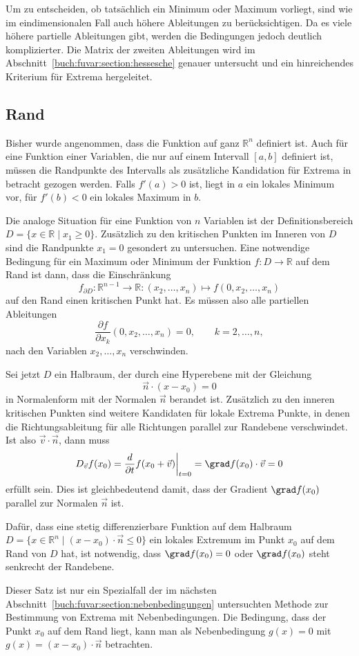 Um zu entscheiden, ob tatsächlich ein Minimum oder Maximum vorliegt,
sind wie im eindimensionalen Fall auch höhere Ableitungen zu berücksichtigen.
Da es viele höhere partielle Ableitungen gibt, werden die Bedingungen
jedoch deutlich komplizierter.
Die Matrix der zweiten Ableitungen wird im
Abschnitt~\ref{buch:fuvar:section:hessesche} genauer untersucht 
und ein hinreichendes Kriterium für Extrema hergeleitet.

%
%
\subsection{Rand}
Bisher wurde angenommen, dass die Funktion auf ganz $\mathbb{R}^n$
definiert ist.
Auch für eine Funktion einer Variablen, die nur auf einem Intervall
$[a,b]$ definiert ist, müssen die Randpunkte des Intervalls als
zusätzliche Kandidation für Extrema in betracht gezogen werden.
Falls $f'(a)>0$ ist, liegt in $a$ ein lokales Minimum vor, für
$f'(b)<0$ ein lokales Maximum in $b$.

Die analoge Situation für eine Funktion von $n$ Variablen ist der
Definitionsbereich $D=\{x\in \mathbb{R}\mid x_1\ge 0\}$.
Zusätzlich zu den kritischen Punkten im Inneren von $D$ sind die
Randpunkte $x_1=0$ gesondert zu untersuchen.
Eine notwendige Bedingung für ein Maximum oder Minimum der Funktion
$f\colon D\to\mathbb{R}$ auf dem Rand ist dann, dass die Einschränkung
\[
f_{\partial D}
\colon
\mathbb{R}^{n-1}\to \mathbb{R}
:
(x_2,\dots,x_n)\mapsto f(0,x_2,\dots,x_n)
\]
auf den Rand einen kritischen Punkt hat.
Es müssen also alle partiellen Ableitungen
\[
\frac{\partial f}{\partial x_k}(0,x_2,\dots,x_n)
=
0,\qquad k=2,\dots,n,
\]
nach den Variablen
$x_2,\dots,x_n$ verschwinden.

Sei jetzt $D$ ein Halbraum, der durch eine Hyperebene mit der Gleichung
\[
\vec{n}\cdot (x-x_0) = 0
\]
in Normalenform mit der Normalen $\vec{n}$ berandet ist.
Zusätzlich zu den inneren kritischen Punkten sind weitere Kandidaten
für lokale Extrema Punkte, in denen die Richtungsableitung für alle
Richtungen parallel zur Randebene verschwindet.
Ist also $\vec{v}\cdot \vec{n}$, dann muss
\[
D_{\vec{v}} f(x_0)
=
\frac{d}{\partial t}f(x_0+\vec{v})\bigg|_{t=0}
=
\grad f(x_0)\cdot \vec{v}
=
0
\]
erfüllt sein.
Dies ist gleichbedeutend damit, dass der Gradient $\grad f(x_0)$ parallel
zur Normalen $\vec{n}$ ist.

\begin{satz}
Dafür, dass eine stetig differenzierbare Funktion auf dem Halbraum
$D=\{x\in\mathbb{R}^n\mid (x-x_0)\cdot\vec{n}\le 0\}$ ein lokales 
Extremum im Punkt $x_0$ auf dem Rand von $D$ hat, ist notwendig,
dass $\grad f(x_0)=0$ oder $\grad f(x_0)$ steht senkrecht der Randebene.
\end{satz}

Dieser Satz ist nur ein Spezialfall der im nächsten
Abschnitt~\ref{buch:fuvar:section:nebenbedingungen}
untersuchten Methode zur Bestimmung von Extrema mit Nebenbedingungen.
Die Bedingung, dass der Punkt $x_0$ auf dem Rand liegt, kann man
als Nebenbedingung $g(x) = 0$ mit $g(x)=(x-x_0)\cdot\vec{n}$ betrachten.




